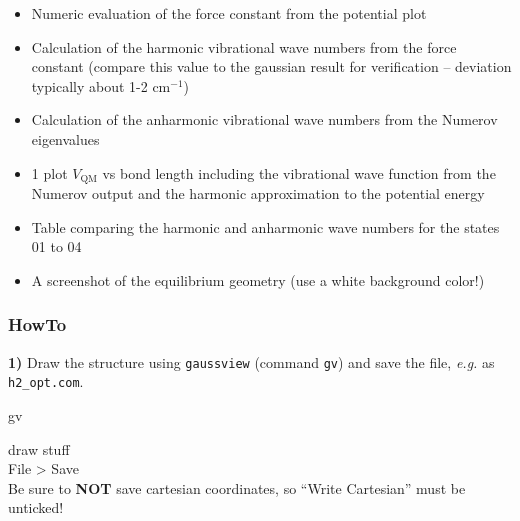 \documentclass[
  letterpaper,
]{article}
\newenvironment{Shaded}{\begin{snugshade}}{\end{snugshade}}
\newcommand{\ExtensionTok}[1]{\textcolor[rgb]{0.00,0.23,0.31}{#1}}
\providecommand{\tightlist}{%
  \setlength{\itemsep}{0pt}\setlength{\parskip}{0pt}}\usepackage{longtable,booktabs,array}
\begin{document}
\begin{itemize}
\tightlist
\item
  Numeric evaluation of the force constant from the potential plot
\item
  Calculation of the harmonic vibrational wave numbers from the force
  constant (compare this value to the gaussian result for verification
  -- deviation typically about 1-2 \(\mathrm{cm^{-1}}\))
\item
  Calculation of the anharmonic vibrational wave numbers from the
  Numerov eigenvalues
\item
  1 plot \(V_{\mathrm{QM}}\) vs bond length including the vibrational
  wave function from the Numerov output and the harmonic approximation
  to the potential energy
\item
  Table comparing the harmonic and anharmonic wave numbers for the
  states 01 to 04
\item
  A screenshot of the equilibrium geometry (use a white background
  color!)
\end{itemize}

\hypertarget{howto-1}{%
\subsubsection*{HowTo}\label{howto-1}}

\textbf{1)} Draw the structure using \texttt{gaussview} (command
\texttt{gv}) and save the file, \emph{e.g.} as \texttt{h2\_opt.com}.

\begin{Shaded}
\begin{Highlighting}[]
\ExtensionTok{gv}
\end{Highlighting}
\end{Shaded}

\begin{tcolorbox}[enhanced jigsaw, toptitle=1mm, opacitybacktitle=0.6, colframe=quarto-callout-note-color-frame, toprule=.15mm, breakable, bottomrule=.15mm, left=2mm, title={Note}, titlerule=0mm, leftrule=.75mm, bottomtitle=1mm, coltitle=black, arc=.35mm, rightrule=.15mm, opacityback=0, colback=white, colbacktitle=quarto-callout-note-color!10!white]

draw stuff\\
File \textgreater{} Save\\
Be sure to \textbf{NOT} save cartesian coordinates, so ``Write
Cartesian'' must be unticked!

\end{tcolorbox}
\end{document}
